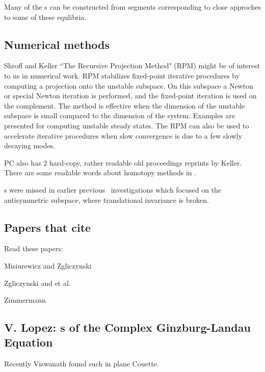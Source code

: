 
Many of the \rpo s can be constructed from segments corresponding to
close approches to some of these equlibria.

\subsection{Numerical methods}

Shroff and Keller
``The Recursive Projection Method" (RPM)
might be of interest to us in numerical work.
RPM stabilizes fixed-point iterative
procedures by computing a projection onto the unstable subspace.
On this subspace a Newton or special Newton iteration is performed,
and the fixed-point iteration is used on the complement.
The method is effective when the dimension of the unstable subspace
is small compared to the dimension of the system.
Examples are presented for computing unstable steady states.
The RPM can also be used to accelerate iterative procedures when
slow convergence is due to a few slowly decaying modes.

PC also has 2 hard-copy, rather readable
old proceedings reprints by Keller.
There are some readable words about homotopy methods in
.

{\Rpo s} were missed in earlier
previous \KS\ investigations%
which focused on the antisymmetric subspace, where translational invariance
is broken.

\subsection*{Papers that cite }

Read these papers:

Misiurewicz and Zgliczynski

Zgliczynski and et al.

Zimmermann

\subsection*{V. Lopez:
        {\Rpo s} of the Complex Ginzburg-Landau Equation}

        Recently
 Viswanath found such in plane Couette.

